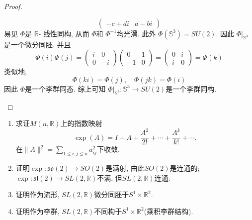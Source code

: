 \documentclass[../main.tex]{subfiles}
\begin{document}
\begin{proof}
\begin{enumerate}
\[\begin{pmatrix}
             -c+  di & a-b i 
        \end{pmatrix}  
        \] 易见 \(  \Phi   \)是 \(  \mathbb{R}   \)- 线性同构, 从而 \(  \Phi   \)和 \(  \Phi ^{-1}   \)均光滑.  此外  \(  \Phi \left( \mathbb{S}^{3} \right)=  SU\left( 2 \right)    \). 因此 \(  \Phi |_{\mathbb{S}^{3}}  \)是一个微分同胚.  并且 \[
        \Phi \left( i \right)\Phi \left( j \right)= \begin{pmatrix} 
            i&0\\ 
             0&-i 
        \end{pmatrix}   \begin{pmatrix} 
            0&1\\ 
             -1&0 
        \end{pmatrix} = \begin{pmatrix} 
            0&i\\ 
             i&0 
        \end{pmatrix}= \Phi \left( k \right)  
        \]类似地, \[
        \Phi \left(ki \right)= \Phi \left( j \right),\quad \Phi \left( jk \right)= \Phi \left( i \right)    
        \]因此 \(  \Phi   \)是一个李群同态. 综上可知 \(  \Phi|_{\mathbb{S}^{3}}:\mathbb{S}^{3}\to SU\left( 2 \right)    \)是一个李群同构. 
    \end{enumerate}
    
\end{proof}
\begin{exercise}{}{}
\begin{enumerate}
\item 求证\(M(n,\mathbb{R})\)上的指数映射
\[
\exp(A)=I+A+\frac{A^{2}}{2!}+\cdots+\frac{A^{k}}{k!}+\cdots .
\]
在\(\|A\|^{2}=\sum _{1\le i,j\le n}a_{ij}^{2}\)下收敛.
\item 证明\(\exp\colon \mathfrak{so}(2)\to SO(2)\)是满射, 由此\(SO(2)\)是连通的; \(\exp\colon \mathfrak{sl}(2)\to SL\left( 2,\mathbb{R}  \right) \)不满, 但\(SL(2,\mathbb{R})\)连通.
\item 证明作为流形, \(SL(2,\mathbb{R})\)微分同胚于\(S^{1}\times\mathbb{R}^{2}\).
\item 证明作为李群, \(SL(2,\mathbb{R})\)不同构于\(S^{1}\times\mathbb{R}^{2}\)(乘积李群结构).
\end{enumerate}
\end{exercise}
\end{document}
